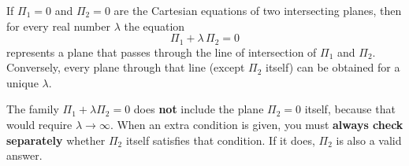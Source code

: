 \documentclass[11pt]{article}
\begin{document}
\begin{propriete}
If $\Pi_1=0$ and $\Pi_2=0$ are the Cartesian equations of two intersecting planes, then for every real number $\lambda$ the equation
\[
\Pi_1 + \lambda\,\Pi_2 = 0
\]
represents a plane that passes through the line of intersection of $\Pi_1$ and $\Pi_2$. Conversely, every plane through that line (except $\Pi_2$ itself) can be obtained for a unique $\lambda$.
\end{propriete}

\begin{attention}
The family $\Pi_1 + \lambda\Pi_2 = 0$ does \textbf{not} include the plane $\Pi_2=0$ itself, because that would require $\lambda\to\infty$. When an extra condition is given, you must \textbf{always check separately} whether $\Pi_2$ itself satisfies that condition. If it does, $\Pi_2$ is also a valid answer.
\end{attention}
\end{document}
